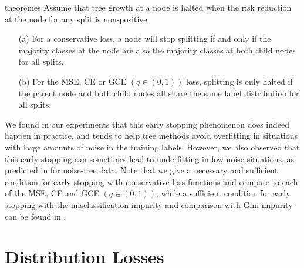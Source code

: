 \documentclass[letterpaper]{article} %
\newcommand{\bn}{{\bm{n}}}
\newcommand{\cM}{{\cal{M}}}
\newcommand{\cS}{{\cal{S}}}
\newcommand{\RR}{{\rm RR}}
\begin{document}
\begin{restatable}{theorem}{es}
\label{thm:early_stopping}
    Assume that tree growth at a node is halted when the risk reduction at the node for any split is non-positive.
    \begin{itemize}
    \item[(a)] For a conservative loss, a node will stop splitting if and only if the majority classes at the node are also the majority classes at both child nodes for all splits.  
    \item[(b)] For the MSE, CE or GCE $(q\in(0,1))$ loss, splitting is only halted if the parent node and both child nodes all share the same label distribution for all splits.
    \end{itemize}
\end{restatable}

We found in our experiments that this early stopping phenomenon does indeed happen in practice, and tends to help tree methods avoid overfitting in situations with large amounts of noise in the training labels. 
However, we also observed that this early stopping can sometimes lead to underfitting in low noise situations, as predicted in \cite{breiman1984classification} for noise-free data.
Note that we give a necessary and sufficient condition for early stopping with
conservative loss functions and compare to each of the MSE, CE and GCE $(q\in(0,1))$, while a sufficient condition for early stopping with the misclassification impurity and comparison with Gini impurity can be found in \cite{breiman1984classification}. 



\section{Distribution Losses}
\label{sec:new-framework}
\end{document}
